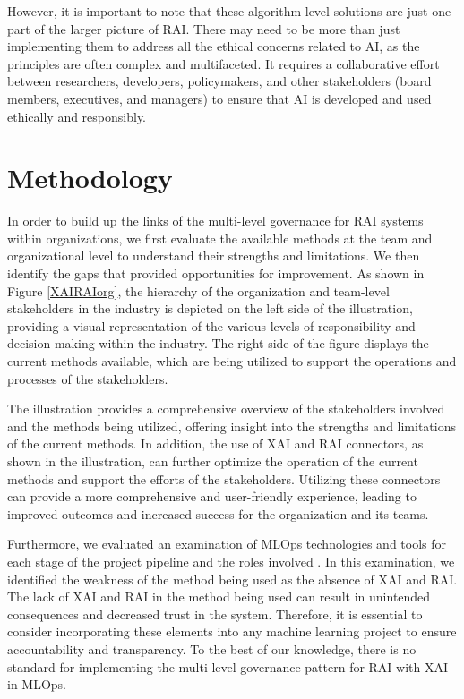 \documentclass[conference]{IEEEtran}
\begin{document}
However, it is important to note that these algorithm-level solutions are just one part of the larger picture of RAI. 
There may need to be more than just implementing them to address all the ethical concerns related to AI, as the principles are often complex and multifaceted. It requires a collaborative effort between researchers, developers, policymakers, and other stakeholders (board members, executives, and managers) to ensure that AI is developed and used ethically and responsibly.

\section{Methodology}
In order to build up the links of the multi-level governance for RAI systems within organizations, we first evaluate the available methods at the team and organizational level \cite{catalogue} to understand their strengths and limitations. We then identify the gaps that provided opportunities for improvement. As shown in Figure \ref{XAIRAIorg}, the hierarchy of the organization and team-level stakeholders in the industry is depicted on the left side of the illustration, providing a visual representation of the various levels of responsibility and decision-making within the industry. The right side of the figure displays the current methods available, which are being utilized to support the operations and processes of the stakeholders.

The illustration provides a comprehensive overview of the stakeholders involved and the methods being utilized, offering insight into the strengths and limitations of the current methods. In addition, the use of XAI and RAI connectors, as shown in the illustration, can further optimize the operation of the current methods and support the efforts of the stakeholders. Utilizing these connectors can provide a more comprehensive and user-friendly experience, leading to improved outcomes and increased success for the organization and its teams.

Furthermore, we evaluated an examination of MLOps technologies and tools for each stage of the project pipeline and the roles involved \cite{mlops-without}. In this examination, we identified the weakness of the method being used as the absence of XAI and RAI. The lack of XAI and RAI in the method being used can result in unintended consequences and decreased trust in the system. Therefore, it is essential to consider incorporating these elements into any machine learning project to ensure accountability and transparency. To the best of our knowledge, there is no standard for implementing the multi-level governance pattern for RAI with XAI in MLOps.
\end{document}
